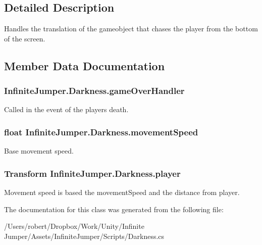 \subsection{Detailed Description}
Handles the translation of the gameobject that chases the player from the bottom of the screen. 



\subsection{Member Data Documentation}
\hypertarget{class_infinite_jumper_1_1_darkness_adace7d7f3310201b815f1a488c0cbbcf}{}
\subsubsection[{game\+Over\+Handler}]{ Infinite\+Jumper.\+Darkness.\+game\+Over\+Handler}\label{class_infinite_jumper_1_1_darkness_adace7d7f3310201b815f1a488c0cbbcf}


Called in the event of the players death. 

\hypertarget{class_infinite_jumper_1_1_darkness_a355795f32e1f1aaa853e469b0129903e}{}
\subsubsection[{movement\+Speed}]{\setlength{\rightskip}{0pt plus 5cm}float Infinite\+Jumper.\+Darkness.\+movement\+Speed}\label{class_infinite_jumper_1_1_darkness_a355795f32e1f1aaa853e469b0129903e}


Base movement speed. 

\hypertarget{class_infinite_jumper_1_1_darkness_acaeaa5d8e8335dbae8a33f9841553f2d}{}
\subsubsection[{player}]{\setlength{\rightskip}{0pt plus 5cm}Transform Infinite\+Jumper.\+Darkness.\+player}\label{class_infinite_jumper_1_1_darkness_acaeaa5d8e8335dbae8a33f9841553f2d}


Movement speed is based the movement\+Speed and the distance from player. 



The documentation for this class was generated from the following file\+:\begin{DoxyCompactItemize}
\item 
/\+Users/robert/\+Dropbox/\+Work/\+Unity/\+Infinite Jumper/\+Assets/\+Infinite\+Jumper/\+Scripts/Darkness.\+cs\end{DoxyCompactItemize}
